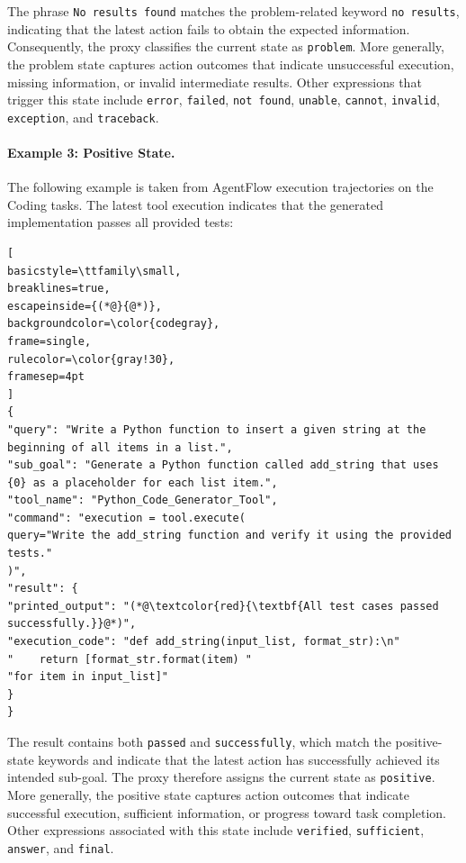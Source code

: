 The phrase \texttt{No results found} matches the problem-related keyword \texttt{no results}, indicating that the latest action fails to obtain the expected information. Consequently, the proxy classifies the current state as \texttt{problem}. More generally, the problem state captures action outcomes that indicate unsuccessful execution, missing information, or invalid intermediate results. Other expressions that trigger this state include \texttt{error}, \texttt{failed}, \texttt{not found}, \texttt{unable}, \texttt{cannot}, \texttt{invalid}, \texttt{exception}, and \texttt{traceback}.


\paragraph{Example 3: Positive State.}
The following example is taken from AgentFlow execution trajectories on the Coding tasks. 
The latest tool execution indicates that the
generated implementation passes all provided tests:

\begin{lstlisting}[
basicstyle=\ttfamily\small,
breaklines=true,
escapeinside={(*@}{@*)},
backgroundcolor=\color{codegray},
frame=single,
rulecolor=\color{gray!30},
framesep=4pt
]
{
"query": "Write a Python function to insert a given string at the beginning of all items in a list.",
"sub_goal": "Generate a Python function called add_string that uses {0} as a placeholder for each list item.",
"tool_name": "Python_Code_Generator_Tool",
"command": "execution = tool.execute(
query="Write the add_string function and verify it using the provided tests."
)",
"result": {
"printed_output": "(*@\textcolor{red}{\textbf{All test cases passed successfully.}}@*)",
"execution_code": "def add_string(input_list, format_str):\n"
"    return [format_str.format(item) "
"for item in input_list]"
}
}
\end{lstlisting}

The result contains both \texttt{passed} and \texttt{successfully}, which match the positive-state keywords and indicate that the latest action has successfully achieved its intended sub-goal. The proxy therefore assigns the current state as \texttt{positive}. More generally, the positive state captures action outcomes that indicate successful execution, sufficient information, or progress toward task completion. Other expressions associated with this state include \texttt{verified}, \texttt{sufficient}, \texttt{answer}, and \texttt{final}.

\clearpage


